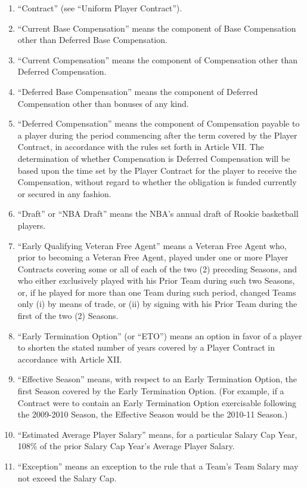 \documentclass[
]{book}
\begin{document}
\begin{enumerate}
\item
  ``Contract'' (see ``Uniform Player Contract'').
\item
  ``Current Base Compensation'' means the component of Base Compensation other than Deferred Base Compensation.
\item
  ``Current Compensation'' means the component of Compensation other than Deferred Compensation.
\item
  ``Deferred Base Compensation'' means the component of Deferred Compensation other than bonuses of any kind.
\item
  ``Deferred Compensation'' means the component of Compensation payable to a player during the period commencing after the term covered by the Player Contract, in accordance with the rules set forth in Article VII. The determination of whether Compensation is Deferred Compensation will be based upon the time set by the Player Contract for the player to receive the Compensation, without regard to whether the obligation is funded currently or secured in any fashion.
\item
  ``Draft'' or ``NBA Draft'' means the NBA's annual draft of Rookie basketball players.
\item
  ``Early Qualifying Veteran Free Agent'' means a Veteran Free Agent who, prior to becoming a Veteran Free Agent, played under one or more Player Contracts covering some or all of each of the two (2) preceding Seasons, and who either exclusively played with his Prior Team during such two Seasons, or, if he played for more than one Team during such period, changed Teams only (i) by means of trade, or (ii) by signing with his Prior Team during the first of the two (2) Seasons.
\item
  ``Early Termination Option'' (or ``ETO'') means an option in favor of a player to shorten the stated number of years covered by a Player Contract in accordance with Article XII.
\item
  ``Effective Season'' means, with respect to an Early Termination Option, the first Season covered by the Early Termination Option. (For example, if a Contract were to contain an Early Termination Option exercisable following the 2009-2010 Season, the Effective Season would be the 2010-11 Season.)
\item
  ``Estimated Average Player Salary'' means, for a particular Salary Cap Year, 108\% of the prior Salary Cap Year's Average Player Salary.
\item
  ``Exception'' means an exception to the rule that a Team's Team Salary may not exceed the Salary Cap.

\end{enumerate}
\end{document}
